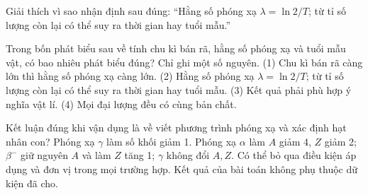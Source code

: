 \begin{bt}
Giải thích vì sao nhận định sau đúng: “Hằng số phóng xạ $\lambda=\ln2/T$; từ tỉ số lượng còn lại có thể suy ra thời gian hay tuổi mẫu.”
\end{bt}

\begin{ex}
Trong bốn phát biểu sau về tính chu kì bán rã, hằng số phóng xạ và tuổi mẫu vật, có bao nhiêu phát biểu đúng? Chỉ ghi một số nguyên. (1) Chu kì bán rã càng lớn thì hằng số phóng xạ càng lớn. (2) Hằng số phóng xạ $\lambda=\ln2/T$; từ tỉ số lượng còn lại có thể suy ra thời gian hay tuổi mẫu. (3) Kết quả phải phù hợp ý nghĩa vật lí. (4) Mọi đại lượng đều có cùng bản chất.
\end{ex}

\begin{ex}
Kết luận đúng khi vận dụng là về viết phương trình phóng xạ và xác định hạt nhân con?
\choice
{Phóng xạ $\gamma$ làm số khối giảm 1.}
{\True Phóng xạ $\alpha$ làm $A$ giảm 4, $Z$ giảm 2; $\beta^-$ giữ nguyên $A$ và làm $Z$ tăng 1; $\gamma$ không đổi $A,Z$.}
{Có thể bỏ qua điều kiện áp dụng và đơn vị trong mọi trường hợp.}
{Kết quả của bài toán không phụ thuộc dữ kiện đã cho.}
\end{ex}

